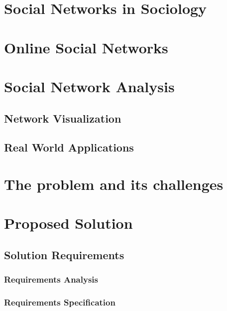 \documentclass[
  oneside,
  11pt, a4paper,
  footinclude=true,
  headinclude=true,
  cleardoublepage=empty
]{scrbook}
\begin{document}
	
	\chapter{Social Networks in Sociology}
	
	
	
	\chapter{Online Social Networks}
	
	
	
	\chapter{Social Network Analysis}
	
	
	\section{Network Visualization}
	
	\section{Real World Applications}


	\chapter{The problem and its challenges}


	\chapter{Proposed Solution}
	\section{Solution Requirements}
	\subsection{Requirements Analysis}
	\subsection{Requirements Specification}
\end{document}

